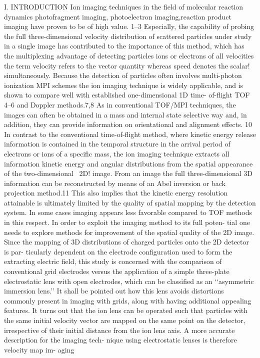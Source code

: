 I. INTRODUCTION
Ion imaging techniques in the field of molecular reaction dynamics photofragment  imaging,  photoelectron  imaging,reaction   product   imaging have   proven   to   be   of   high value.
1–3 Especially, the capability of probing the full three-dimensional velocity distribution of scattered particles under study in a single image has contributed to the importance of this method, which has the multiplexing advantage of detecting  particles ions  or  electrons of  all  velocities  the  term velocity refers to the vector quantity whereas speed denotes the scalar! simultaneously. Because the detection of particles often  involves  multi-photon  ionization MPI schemes  the ion imaging technique is widely applicable, and is shown to compare  well  with  established  one-dimensional 1D time- of-flight TOF 4–6 and  Doppler  methods.7,8
As  in  conventional  TOF/MPI  techniques,  the  images  can  often  be  obtained  in  a  mass  and  internal state  selective  way  and,  in addition, they can provide information on orientational and alignment effects. 10
In  contrast  to  the  conventional  time-of-flight  method, where kinetic energy release information is contained in the temporal structure in the arrival period of electrons or ions of a specific mass, the ion imaging technique extracts all information kinetic  energy  and  angular  distributions from  the spatial appearance of the two-dimensional~ 2D! image. From an image the full three-dimensional 3D information can be reconstructed  by  means  of  an  Abel  inversion or  back projection method.11
This  also  implies  that  the  kinetic  energy resolution attainable is ultimately limited by the quality of  spatial  mapping  by  the  detection  system.  In  some  cases imaging appears less favorable compared to TOF methods in this respect.
In order to exploit the imaging method to its full poten-
tial  one  needs  to  explore  methods  for  improvement  of  the
spatial  quality  of  the  2D  image.  Since  the  mapping  of  3D
distributions of charged particles onto the 2D detector is par-
ticularly  dependent  on  the  electrode  configuration  used  to
form the extracting electric field, this study is concerned with
the  comparison  of  conventional  grid  electrodes  versus  the
application  of  a  simple  three-plate  electrostatic  lens  with
open electrodes, which can be classified as an ‘‘asymmetric
immersion lens.’’ It shall be pointed out how this lens avoids
distortions  commonly  present  in  imaging  with  grids,  along
with  having  additional  appealing  features.  It  turns  out  that
the ion lens can be operated such that particles with the same
initial velocity vector are mapped on the same point on the
detector,  irrespective  of  their  initial  distance  from  the  ion
lens axis. A more accurate description for the imaging tech-
nique using electrostatic lenses is therefore
velocity map im-
aging
